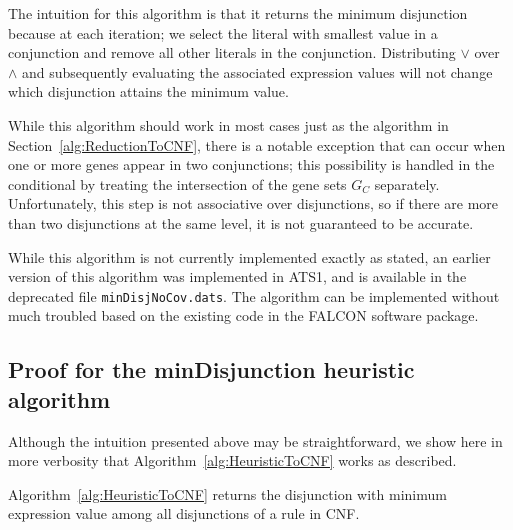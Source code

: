 The intuition for this algorithm is that it returns the minimum
disjunction because at each iteration; we select the literal with
smallest value in a conjunction and remove all other literals in the
conjunction. Distributing $\lor$ over $\land$ and subsequently
evaluating the associated expression values will not change which
disjunction attains the minimum value.

While this algorithm should work in most cases just as the algorithm
in Section~\ref{alg:ReductionToCNF}, there is a notable exception that
can occur when one or more genes appear in two conjunctions; this
possibility is handled in the conditional by treating the intersection
of the gene sets $G_C$ separately. Unfortunately, this step is not
associative over disjunctions, so if there are more than two
disjunctions at the same level, it is not guaranteed to be accurate.

While this algorithm is not currently implemented exactly as stated, 
an earlier version of this algorithm was implemented in ATS1, and
is available in the deprecated file \texttt{minDisjNoCov.dats}.
The algorithm can be implemented without much troubled based on the
existing code in the FALCON software package.

\subsection{Proof for the minDisjunction heuristic algorithm}

Although the intuition presented above may be straightforward, we show
here in more verbosity that Algorithm~\ref{alg:HeuristicToCNF} works
as described.

\begin{Theorem}
\label{thm:HeuristicToCNF}
Algorithm~\ref{alg:HeuristicToCNF} returns the disjunction with
minimum expression value among all disjunctions of a rule in CNF.
\end{Theorem}

